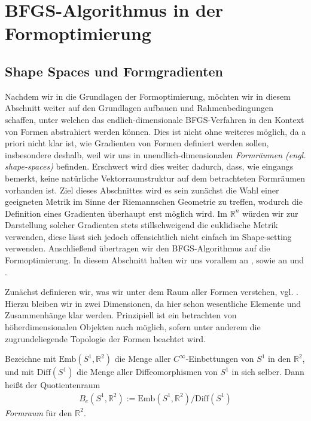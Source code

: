 
\section{BFGS-Algorithmus in der Formoptimierung}\label{Chap_3}
\subsection{Shape Spaces und Formgradienten}
\label{Chap_shapespaces}


Nachdem wir in die Grundlagen der Formoptimierung, möchten wir in diesem Abschnitt weiter auf den Grundlagen aufbauen und Rahmenbedingungen schaffen, unter welchen das endlich-dimensionale BFGS-Verfahren in den Kontext von Formen abstrahiert werden können. Dies ist nicht ohne weiteres möglich, da a priori nicht klar ist, wie Gradienten von Formen definiert werden sollen, insbesondere deshalb, weil wir uns in unendlich-dimensionalen \textit{Formräumen (engl. shape-spaces)} befinden. Erschwert wird dies weiter dadurch, dass, wie eingangs bemerkt, keine natürliche Vektorraumstruktur auf dem betrachteten Formräumen vorhanden ist. Ziel dieses Abschnittes wird es sein zunächst die Wahl einer geeigneten Metrik im Sinne der Riemannschen Geometrie zu treffen, wodurch die Definition eines Gradienten überhaupt erst möglich wird. Im $\mathbb{R}^n$ würden wir zur Darstellung solcher Gradienten stets stillschweigend die euklidische Metrik verwenden, diese lässt sich jedoch offensichtlich nicht einfach im Shape-setting verwenden. Anschließend übertragen wir den BFGS-Algorithmus auf die Formoptimierung. In diesem Abschnitt halten wir uns vorallem an \cite{bfgs2}, sowie an \cite{shape_space} und \cite{bfgs1}.

Zunächst definieren wir, was wir unter dem Raum aller Formen verstehen, vgl. \cite{bfgs1}. Hierzu bleiben wir in zwei Dimensionen, da hier schon wesentliche Elemente und Zusammenhänge klar werden. Prinzipiell ist ein betrachten von höherdimensionalen Objekten auch möglich, sofern unter anderem die zugrundeliegende Topologie der Formen beachtet wird.

\begin{defi}
Bezeichne mit $\text{Emb}(S^1, \mathbb{R}^2)$ die Menge aller $C^\infty$-Einbettungen von $S^1$ in den $\mathbb{R}^2$, und mit $\text{Diff}(S^1)$ die Menge aller Diffeomorphismen von $S^1$ in sich selber. Dann heißt der Quotientenraum
\begin{align*}
	B_e(S^1,\mathbb{R}^2) := \text{Emb}(S^1, \mathbb{R}^2) / \text{Diff}(S^1)
\end{align*}
\textit{Formraum} für den $\mathbb{R}^2$.
\end{defi}

